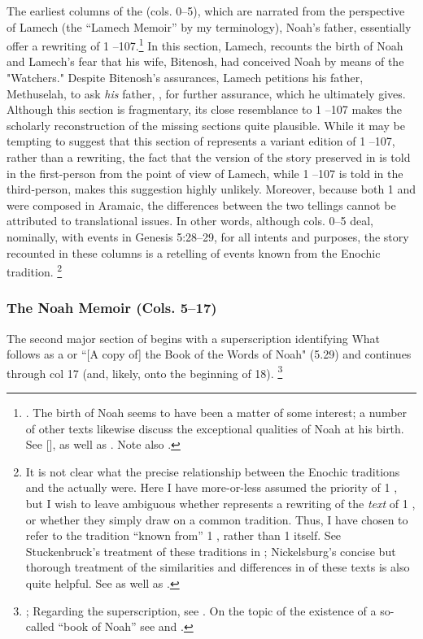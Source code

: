 The earliest columns of the \ga (cols. 0--5), which are narrated from the perspective of Lamech (the ``Lamech Memoir'' by my terminology), Noah's father, essentially offer a rewriting of 1 --107.\footnote{\cite[174]{nickelsburg2005}. The birth of Noah seems to have been a matter of some interest; a number of other texts likewise discuss the exceptional qualities of Noah at his birth. See [],  as well as \cite{vanderkam_kapera1992}. Note also \cite{stuckenbruck_berthelot-etal2010}.} In this section, Lamech, recounts the birth of Noah and Lamech's fear that his wife, Bitenosh, had conceived Noah by means of the  "Watchers." Despite Bitenosh's assurances, Lamech petitions his father, Methuselah, to ask \emph{his} father, \enoch, for further assurance, which he ultimately gives. Although this section is fragmentary, its close resemblance to 1 --107 makes the scholarly reconstruction of the missing sections quite plausible. While it may be tempting to suggest that this section of \ga represents a variant edition of 1 --107, rather than a rewriting, the fact that the version of the story preserved in \ga is told in the first-person from the point of view of Lamech, while 1 --107 is told in the third-person, makes this suggestion highly unlikely. Moreover, because both 1 \enoch and \ga were composed in Aramaic, the differences between the two tellings cannot be attributed to translational issues. In other words, although cols. 0--5 deal, nominally, with events in Genesis 5:28--29, for all intents and purposes, the story recounted in these columns is a retelling of events known from the Enochic tradition.%
%
\footnote{It is not clear what the precise relationship between the Enochic traditions and the \ga actually were. Here I have more-or-less assumed the priority of 1 \enoch, but I wish to leave ambiguous whether \ga represents a rewriting of the \emph{text} of 1 \enoch, or whether they simply draw on a common tradition. Thus, I have chosen to refer to the tradition ``known from'' 1 \enoch, rather than 1 \enoch itself. See Stuckenbruck's treatment of these traditions in \cite*{stuckenbruck_berthelot-etal2010}; Nickelsburg's concise but thorough treatment of the similarities and differences in of these texts is also quite helpful. See \cite[173--174]{nickelsburg2005} as well as \cite[122--123]{fitzmyer2004}.} 


\subsubsection{The Noah Memoir (Cols. 5--17)}
The second major section of \ga begins with a superscription identifying What follows as a  or ``[A copy of] the Book of the Words of Noah" (5.29) and continues through col 17 (and, likely, onto the beginning of 18).%
%
\footnote{\cite[174--175]{nickelsburg2005}; Regarding the superscription, see \cite{steiner_dsd1995}. On the topic of the existence of a so-called ``book of Noah'' see \cite{dimant_vanderkam-etal2006} and \cite{werman_chazon-etal1999}.}

